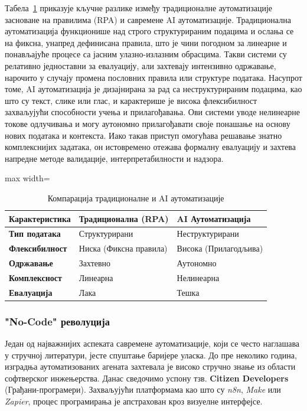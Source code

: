 Табела~\ref{tab:04-1} приказује кључне разлике између традиционалне аутоматизације засноване на правилима (RPA) и савремене AI аутоматизације. Традиционална аутоматизација функционише над строго структурираним подацима и ослања се на фиксна, унапред дефинисана правила, што је чини погодном за линеарне и понављајуће процесе са јасним улазно-излазним обрасцима. Такви системи су релативно једноставни за евалуацију, али захтевају интензивно одржавање, нарочито у случају промена пословних правила или структуре података.
Насупрот томе, AI аутоматизација је дизајнирана за рад са неструктурираним подацима, као што су текст, слике или глас, и карактерише је висока флексибилност захваљујући способности учења и прилагођавања. Ови системи уводе нелинеарне токове одлучивања и могу аутономно прилагођавати своје понашање на основу нових података и контекста. Иако такав приступ омогућава решавање знатно комплекснијих задатака, он истовремено отежава формалну евалуацију и захтева напредне методе валидације, интерпретабилности и надзора.


\begin{table}[h]
\centering
\caption{Компарација традиционалне и AI аутоматизације}
\vspace{0.3cm}
\begin{adjustbox}{max width=\textwidth}
\begin{tabular}{|p{5cm}|p{4.5cm}|p{4.5cm}|}
\hline
\textbf{Карактеристика} & \textbf{Традиционална (RPA)} & \textbf{AI Аутоматизација} \\
\hline
\textbf{Тип података} & Структурирани & Неструктурирани  \\
\hline
\textbf{Флексибилност} & Ниска (Фиксна правила) & Висока (Прилагодљива) \\
\hline
\textbf{Одржавање} & Захтевно  & Аутономно  \\
\hline
\textbf{Комплексност} & Линеарна & Нелинеарна \\
\hline
\textbf{Евалуација} & Лака & Тешка \\
\hline
\end{tabular}
\end{adjustbox}
\label{tab:04-1}
\end{table}

\subsubsection{"No-Code" револуција}

Један од најважнијих аспеката савремене аутоматизације, који се често наглашава у стручној литератури, јесте спуштање баријере уласка. До пре неколико година, изградња аутоматизованих агената захтевала је високо стручно знање из области софтверског инжењерства. Данас сведочимо успону тзв. \textbf{Citizen Developers} (Грађани-програмери). Захваљујући платформама као што су \textit{n8n}, \textit{Make} или \textit{Zapier}, процес програмирања је апстрахован кроз визуелне интерфејсе.

